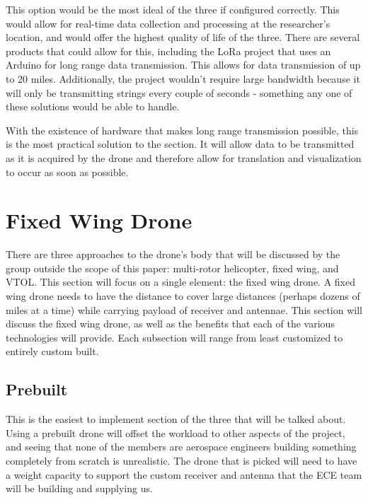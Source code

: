 \documentclass[onecolumn, draftclsnofoot,10pt, compsoc]{IEEEtran}
\begin{document}
This option would be the most ideal of the three if configured correctly. This would allow for real-time data collection and processing at the researcher's location, and would offer the highest quality of life of the three. There are several products that could allow for this, including the LoRa project that uses an Arduino for long range data transmission\cite{LoRaTransmission}. This allows for data transmission of up to 20 miles. Additionally, the project wouldn't require large bandwidth because it will only be transmitting strings every couple of seconds - something any one of these solutions would be able to handle.

With the existence of hardware that makes long range transmission possible, this is the most practical solution to the section. It will allow data to be transmitted as it is acquired by the drone and therefore allow for translation and visualization to occur as soon as possible.

\section{Fixed Wing Drone}

There are three approaches to the drone's body that will be discussed by the group outside the scope of this paper: multi-rotor helicopter, fixed wing, and VTOL. This section will focus on a single element: the fixed wing drone. A fixed wing drone needs to have the distance to cover large distances (perhaps dozens of miles at a time) while carrying payload of receiver and antennae. This section will discuss the fixed wing drone, as well as the benefits that each of the various technologies will provide. Each subsection will range from least customized to entirely custom built.

\subsection{Prebuilt}

This is the easiest to implement section of the three that will be talked about. Using a prebuilt drone will offset the workload to other aspects of the project, and seeing that none of the members are aerospace engineers building something completely from scratch is unrealistic. The drone that is picked will need to have a weight capacity to support the custom receiver and antenna that the ECE team will be building and supplying us. 
\end{document}
